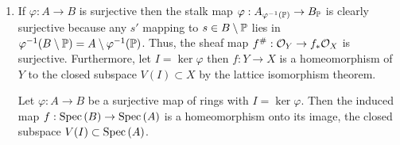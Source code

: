 \documentclass[12pt]{article}
\begin{document}
\begin{enumerate}
\begin{proof}
\end{proof}
\begin{lemma}
$\overline{f(V(I))} = V(\varphi^{-1}(I))$.
\end{lemma}
\begin{proof}
Consider $f(V(I)) \subset V(J)$ then $J \subset \varphi^{-1}(\P)$ for each prime ideal $\P \subset B$ above $I$ so $\varphi(J) \subset \sqrt{I}$. By the above lemma, $J \subset \varphi^{-1}(\sqrt{I}) = \sqrt{\varphi^{-1}(I)}$ and thus,
\[ V(J) \supset V(\sqrt{\varphi^{-1}(I)}) = V(\varphi^{-1}(I)) \] Furthermore, if $\p \supset f(V(I))$ then $\p = \varphi^{-1}(\P)$ with $\P \supset I$ so then $\p \supset \varphi^{-1}(I)$ and thus $\p \in V(\varphi^{-1}(I))$. Thus $f(V(I)) \subset V(\varphi^{-1}(I))$ which proves that $\overline{f(V(I))} = V(\varphi^{-1}(I))$.
\end{proof}

\begin{corollary}
$\overline{f(Y)} = V(\ker{\varphi})$ so $f$ is dominant iff $\ker{\varphi} \subset \nilrad{A}$.
\end{corollary} 
Therefore, in this case, $\ker{\varphi} = 0$ so $f$ is dominant. 

\item If $\varphi : A \to B$ is surjective then the stalk map $\varphi : A_{\varphi^{-1}(\P)} \to B_\P$ is clearly surjective because any $s'$ mapping to $s \in B \setminus \P$ lies in $\varphi^{-1}(B \setminus \P) = A \setminus \varphi^{-1}(\P)$. Thus, the sheaf map $f^\# : \struct{Y} \to f_* \struct{X}$ is surjective. Furthermore, let $I = \ker{\varphi}$ then $f : Y \to X$ is a homeomorphism of $Y$ to the closed subspace $V(I) \subset X$ by the lattice isomorphism theorem. 

\begin{proposition}
Let $\varphi : A \to B$ be a surjective map of rings with $I = \ker{\varphi}$. Then the induced map $f : \Spec{B} \to \Spec{A}$ is a homeomorphism onto its image, the closed subspace $V(I) \subset \Spec{A}$.
\end{proposition}


\end{enumerate}
\end{document}
